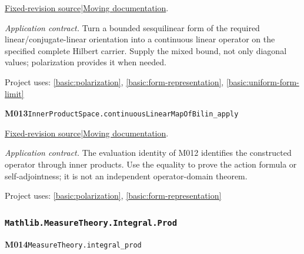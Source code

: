 \documentclass[11pt,a4paper]{article}
\theoremstyle{definition}
\theoremstyle{remark}
\begin{document}
\href{https://github.com/leanprover-community/mathlib4/blob/9bac2d0692944a775113f7c130fd5e5b4608a854/Mathlib/Analysis/InnerProductSpace/Dual.lean}{Fixed-revision source}\quad|\quad\href{https://leanprover-community.github.io/mathlib4_docs/Mathlib/Analysis/InnerProductSpace/Dual.html#InnerProductSpace.continuousLinearMapOfBilin}{Moving documentation}.\par
\noindent\textit{Application contract.} Turn a bounded sesquilinear form of the required linear/conjugate-linear orientation into a continuous linear operator on the specified complete Hilbert carrier. Supply the mixed bound, not only diagonal values; polarization provides it when needed.\par
{\small Project uses: \ref{basic:polarization}, \ref{basic:form-representation}, \ref{basic:uniform-form-limit}}\par\medskip

\noindent\textbf{M013}\label{base:M013}\quad\nolinkurl{InnerProductSpace.continuousLinearMapOfBilin_apply}

\href{https://github.com/leanprover-community/mathlib4/blob/9bac2d0692944a775113f7c130fd5e5b4608a854/Mathlib/Analysis/InnerProductSpace/Dual.lean}{Fixed-revision source}\quad|\quad\href{https://leanprover-community.github.io/mathlib4_docs/Mathlib/Analysis/InnerProductSpace/Dual.html#InnerProductSpace.continuousLinearMapOfBilin_apply}{Moving documentation}.\par
\noindent\textit{Application contract.} The evaluation identity of M012 identifies the constructed operator through inner products. Use the equality to prove the action formula or self-adjointness; it is not an independent operator-domain theorem.\par
{\small Project uses: \ref{basic:polarization}, \ref{basic:form-representation}}\par\medskip

\subsubsection*{\nolinkurl{Mathlib.MeasureTheory.Integral.Prod}}
\noindent\textbf{M014}\label{base:M014}\quad\nolinkurl{MeasureTheory.integral_prod}
\end{document}
